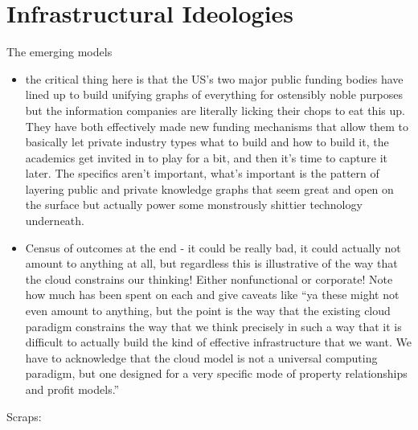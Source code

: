 \hypertarget{infrastructural-ideologies}{%
\section{Infrastructural Ideologies}\label{infrastructural-ideologies}}

The emerging models

\begin{itemize}

\item
  the critical thing here is that the US's two major public funding
  bodies have lined up to build unifying graphs of everything for
  ostensibly noble purposes but the information companies are literally
  licking their chops to eat this up. They have both effectively made
  new funding mechanisms that allow them to basically let private
  industry types what to build and how to build it, the academics get
  invited in to play for a bit, and then it's time to capture it later.
  The specifics aren't important, what's important is the pattern of
  layering public and private knowledge graphs that seem great and open
  on the surface but actually power some monstrously shittier technology
  underneath.
\item
  Census of outcomes at the end - it could be really bad, it could
  actually not amount to anything at all, but regardless this is
  illustrative of the way that the cloud constrains our thinking! Either
  nonfunctional or corporate! Note how much has been spent on each and
  give caveats like ``ya these might not even amount to anything, but
  the point is the way that the existing cloud paradigm constrains the
  way that we think precisely in such a way that it is difficult to
  actually build the kind of effective infrastructure that we want. We
  have to acknowledge that the cloud model is not a universal computing
  paradigm, but one designed for a very specific mode of property
  relationships and profit models.''
\end{itemize}

Scraps:

